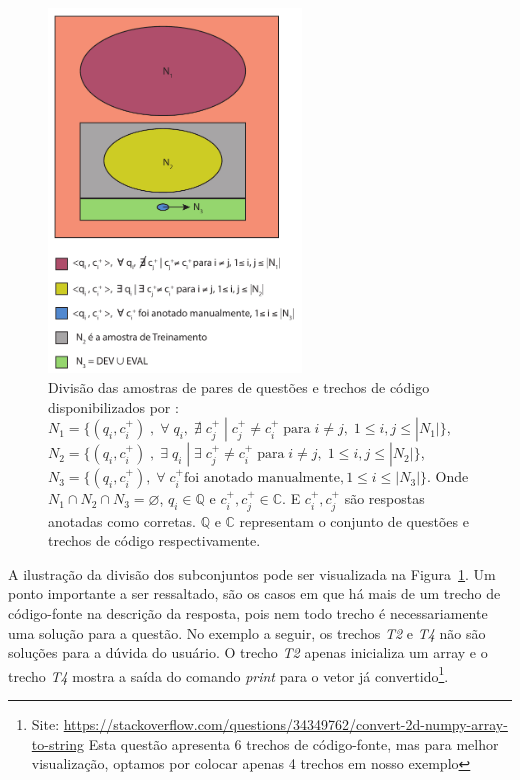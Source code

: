 \begin{figure}[H]
\centering
\includegraphics[width=0.6\textwidth]{figuras/cap-experimento/distinct-subsets-yao-sample.pdf}
\caption{Divisão das amostras de pares de questões e trechos de código disponibilizados por \cite{yao-2018}: $N_{1} = \{(q_{i}, c_{i}^{+})\;,\; \forall\; q_{i},\;\nexists\; c_{j}^{+}\; |\; c_{j}^{+} \neq c_{i}^{+}\; \text{para}\; i \neq j,\; 1 \leq i,j \leq |N_{1}| \}$, $N_{2} = \{(q_{i}, c_{i}^{+})\;,\; \exists\; q_{i}\; | \;\exists\; c_{j}^{+} \neq c_{i}^{+}\; \text{para} \; i \neq j,\; 1 \leq i,j \leq |N_{2}| \}$, $N_{3} = \{(q_{i}, c_{i}^{+}),\; \forall\; c_{i}^{+} \text{foi anotado manualmente}, 1 \leq i \leq |N_{3}| \}$. Onde $N_{1} \cap N_{2} \cap N_{3} = \varnothing$, $q_{i} \in \mathbb{Q}$ e $c_{i}^{+},  c_{j}^{+} \in \mathbb{C}$. E $c_{i}^{+}, c_{j}^{+}$ são respostas anotadas como corretas. $\mathbb{Q}$ e $\mathbb{C}$ representam o conjunto de questões e trechos de código respectivamente.} 
\label{fig:distinct-subset-python-pair-question-code}
\end{figure}

A ilustração da divisão dos subconjuntos pode ser visualizada na Figura~\ref{fig:distinct-subset-python-pair-question-code}. Um ponto importante a ser ressaltado, são os casos em que há mais de um trecho de código-fonte na descrição da resposta, pois nem todo trecho é necessariamente uma solução para a questão. No exemplo a seguir, os trechos \emph{T2} e \emph{T4} não são soluções para a dúvida do usuário. O trecho \emph{T2} apenas inicializa um array e o trecho \emph{T4} mostra a saída do comando \textit{print} para o vetor já convertido\footnote{Site: \url{https://stackoverflow.com/questions/34349762/convert-2d-numpy-array-to-string} Esta questão apresenta 6 trechos de código-fonte, mas para melhor visualização, optamos por colocar apenas 4 trechos em nosso exemplo\label{foot:exemplo-stackoverflow-mais-de-um-trecho}}.



